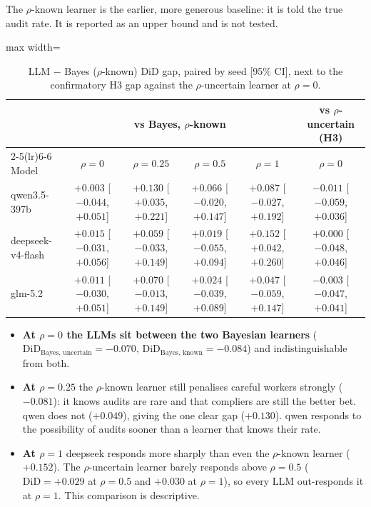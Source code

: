 \documentclass[11pt,letterpaper]{article}
\newcommand{\did}{\mathrm{DiD}}
\numberwithin{equation}{section}
\numberwithin{table}{section}
\numberwithin{figure}{section}
\numberwithin{algorithm}{section}
\begin{document}
The $\rho$-known learner is the earlier, more generous baseline: it is told the true audit rate. It is reported as an upper bound and is not tested.

\begin{table}[h]
\centering\small
\caption{LLM $-$ Bayes ($\rho$-known) $\did$ gap, paired by seed [95\% CI], next to the confirmatory H3 gap against the $\rho$-uncertain learner at $\rho=0$.}
\label{tab:bayesknown}
\begin{adjustbox}{max width=\linewidth}
\begin{tabular}{lccccc}
\toprule
 & \multicolumn{4}{c}{vs Bayes, $\rho$-known} & vs $\rho$-uncertain (H3) \\
\cmidrule(lr){2-5}\cmidrule(lr){6-6}
Model & $\rho=0$ & $\rho=0.25$ & $\rho=0.5$ & $\rho=1$ & $\rho=0$ \\
\midrule
qwen3.5-397b & $+0.003$ [$-0.044$, $+0.051$] & $+0.130$ [$+0.035$, $+0.221$] & $+0.066$ [$-0.020$, $+0.147$] & $+0.087$ [$-0.027$, $+0.192$] & $-0.011$ [$-0.059$, $+0.036$] \\
deepseek-v4-flash & $+0.015$ [$-0.031$, $+0.056$] & $+0.059$ [$-0.033$, $+0.149$] & $+0.019$ [$-0.055$, $+0.094$] & $+0.152$ [$+0.042$, $+0.260$] & $+0.000$ [$-0.048$, $+0.046$] \\
glm-5.2 & $+0.011$ [$-0.030$, $+0.051$] & $+0.070$ [$-0.013$, $+0.149$] & $+0.024$ [$-0.039$, $+0.089$] & $+0.047$ [$-0.059$, $+0.147$] & $-0.003$ [$-0.047$, $+0.041$] \\
\bottomrule
\end{tabular}
\end{adjustbox}
\end{table}

\begin{itemize}
  \item \textbf{At $\rho=0$ the LLMs sit between the two Bayesian learners} ($\did_{\text{Bayes, uncertain}}=-0.070$, $\did_{\text{Bayes, known}}=-0.084$) and indistinguishable from both.
  \item \textbf{At $\rho=0.25$} the $\rho$-known learner still penalises careful workers strongly ($-0.081$): it knows audits are rare and that compliers are still the better bet. qwen does not ($+0.049$), giving the one clear gap ($+0.130$). qwen responds to the possibility of audits sooner than a learner that knows their rate.
  \item \textbf{At $\rho=1$} deepseek responds more sharply than even the $\rho$-known learner ($+0.152$). The $\rho$-uncertain learner barely responds above $\rho=0.5$ ($\did=+0.029$ at $\rho=0.5$ and $+0.030$ at $\rho=1$), so every LLM out-responds it at $\rho=1$. This comparison is descriptive.
\end{itemize}
\end{document}
